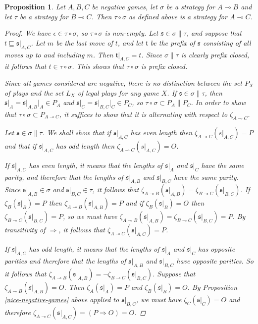 \documentclass[11pt]{article} %
\theoremstyle{plain} %
\newtheorem{proposition}[theorem]{Proposition}
\theoremstyle{definition} %
\theoremstyle{exercisestyle}
\renewcommand{\implies}{\multimap}
\newcommand{\comp}[2]{#1 \circ #2}
\newcommand{\s}{\mathfrak s}
\renewcommand{\t}{\mathfrak t}
\newcommand{\emptyplay}{\epsilon}
\newcommand{\prefix}{\sqsubseteq}
\begin{document}
\begin{proposition}
  Let $A,B,C$ be negative games, let $\sigma$ be a strategy for $A\implies B$ and let $\tau$ be a strategy for $B\implies C$.  Then $\comp\tau\sigma$ as defined above is a strategy for $A\implies C$.
  \begin{proof}
    We have $\emptyplay\in\comp\tau\sigma$, so $\comp\tau\sigma$ is non-empty.  Let $\s\in\sigma\|\tau$, and suppose that $t\prefix\s\vert_{A,C}$.  Let $m$ be the last move of $t$, and let $\t$ be the prefix of $\s$ consisting of all moves up to and including $m$.  Then $\t\vert_{A,C}=t$.  Since $\sigma\|\tau$ is clearly prefix closed, it follows that $t\in\comp\tau\sigma$.  This shows that $\comp\tau\sigma$ is prefix closed.  
    
    Since all games considered are negative,  there is no distinction between the set $P_X$ of plays and the set $L_X$ of legal plays for any game $X$.  If $\s\in\sigma\|\tau$, then $\s\vert_A=\s\vert_{A,B}\vert_A\in P_A$ and $\s\vert_C=\s\vert_{B,C}\vert_C\in P_C$, so $\comp\tau\sigma\subset P_A\|P_C$.  In order to show that $\comp\tau\sigma\subset P_{A\implies C}$, it suffices to show that it is alternating with respect to $\zeta_{A\implies C}$.  

    Let $\s\in\sigma\|\tau$.  We shall show that if $\s\vert_{A,C}$ has even length then $\zeta_{A\implies C}(s\vert_{A,C})=P$ and that if $\s\vert_{A,C}$ has odd length then $\zeta_{A\implies C}(s\vert_{A,C})=O$.

    If $\s\vert_{A,C}$ has even length, it means that the lengths of $\s\vert_A$ and $\s\vert_C$ have the same parity, and therefore that the lengths of $\s\vert_{A,B}$ and $\s\vert_{B,C}$ have the same parity.  Since $\s\vert_{A,B}\in\sigma$ and $\s\vert_{B,C}\in\tau$, it follows that $\zeta_{A\implies B}(\s\vert_{A,B})=\zeta_{B\implies C}(\s\vert_{B,C})$.  If $\zeta_B(\s\vert_B)=P$ then $\zeta_{A\implies B}(\s\vert_{A,B})=P$ and if $\zeta_B(\s\vert_B)=O$ then $\zeta_{B\implies C}(\s\vert_{B,C})=P$, so we must have $\zeta_{A\implies B}(\s\vert_{A,B})=\zeta_{B\implies C}(\s\vert_{B,C})=P$.  By transitivity of $\Rightarrow$, it follows that $\zeta_{A\implies C}(\s\vert_{A,C})=P$.  

    If $\s\vert_{A,C}$ has odd length, it means that the lengths of $\s\vert_A$ and $\s\vert_C$ has opposite parities and therefore that the lengths of $\s\vert_{A,B}$ and $\s\vert_{B,C}$ have opposite parities.  So it follows that $\zeta_{A\implies B}(\s\vert_{A,B})=\neg\zeta_{B\implies C}(\s\vert_{B,C})$.  Suppose that $\zeta_{A\implies B}(\s\vert_{A,B})=O$.  Then $\zeta_A(\s\vert_A)=P$ and $\zeta_B(\s\vert_B)=O$.  By Proposition \ref{nice-negative-games} above applied to $\s\vert_{B,C}$, we must have $\zeta_C(\s\vert_C)=O$ and therefore $\zeta_{A\implies C}(\s\vert_{A,C})=(P\Rightarrow O)=O$.  


\end{proof}
\end{proposition}
\end{document}
